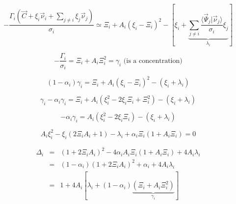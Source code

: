 \documentclass[aps,12pt]{revtex4}
\begin{document}
\begin{equation}
	-\dfrac{\Gamma_i\left(\vec{C}+\xi_i \vec{\nu}_i  + \sum_{j\not= i} \xi_j \vec{\nu}_j \right) }{\sigma_i}  \simeq
	 \Xi_i + A_i \left(\xi_i - \Xi_i\right)^2 - \left[ \xi_i + \underbrace{\sum_{j\not=i}  \dfrac{\langle \vec{\Psi}_j \vert \vec{\nu}_j \rangle}{\sigma_i} \xi_j}_{\lambda_i} \right]
\end{equation}

\begin{equation}
		-\dfrac{\Gamma_i}{\sigma_i} = \Xi_i + A_i \Xi_i^2 = \gamma_i \text{ (is a concentration)}
\end{equation}

\begin{equation}
	(1-\alpha_i) \gamma_i = \Xi_i + A_i \left(\xi_i - \Xi_i\right)^2 - (\xi_i+\lambda_i)
\end{equation}

\begin{equation}
	\gamma_i - \alpha_i \gamma_i = \Xi_i + A_i (\xi_i^2 - 2 \xi_i \Xi_i + \Xi_i^2) - (\xi_i+\lambda_i)
\end{equation}

\begin{equation}
	 	- \alpha_i \gamma_i =  A_i (\xi_i^2 - 2 \xi_i \Xi_i ) - (\xi_i+\lambda_i)
\end{equation}

\begin{equation}
	A_i \xi_i^2 - \xi_i (2\Xi_iA_i+1) - \lambda_i + \alpha_i \Xi_i(1 + A_i \Xi_i) = 0
\end{equation}

\begin{equation}
\begin{array}{rcl}
	\Delta_i & = & (1+2\Xi_iA_i)^2 - 4 \alpha_i A_i \Xi_i (1+A_i\Xi_i) + 4 A_i \lambda_i\\
	& = & (1-\alpha_i) (1+2\Xi_iA_i)^2 + \alpha_i +  4 A_i \lambda_i\\
	& = & 1 + 4 A_i \left[ \lambda_i + (1-\alpha_i) \underbrace{(\Xi_i+A_i\Xi_i^2)}_{\gamma_i}\right] \\
\end{array}
\end{equation}
\end{document}
